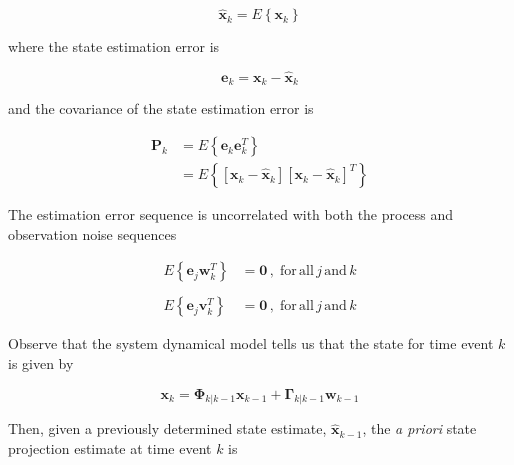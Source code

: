 \begin{equation}
    \hat{\mathbf{x}}_k = E \left\{ \mathbf{x}_k \right\}
    \label{eq:state-estimate}
\end{equation}

where the state estimation error is

\begin{equation*}
    \mathbf{e}_k = \mathbf{x}_{k} - \hat{\mathbf{x}}_k
\end{equation*}

and the covariance of the state estimation error is

\begin{equation}
    \begin{aligned}
        \mathbf{P}_k &= E \left\{ \mathbf{e}_k \mathbf{e}_k^T \right\} \\
        &= E \left\{ \left[ \mathbf{x}_{k} - \hat{\mathbf{x}}_k \right] \left[ \mathbf{x}_{k} - \hat{\mathbf{x}}_k \right]^T \right\}
    \end{aligned}
    \label{eq:state-estimate-error-covariance}
\end{equation}

The estimation error sequence is uncorrelated with both the process and observation noise sequences

\begin{equation*}
    \begin{aligned}
        E \left\{ \mathbf{e}_j \mathbf{w}_k^T \right\} &= \mathbf{0} \, , \phantom{.} \mathrm{for} \, \mathrm{all} \, j \, \mathrm{and} \, k \\
        \phantom{.} \\
        E \left\{ \mathbf{e}_j \mathbf{v}_k^T \right\} &= \mathbf{0} \, , \phantom{.} \mathrm{for} \, \mathrm{all} \, j \, \mathrm{and} \, k
    \end{aligned}
\end{equation*}

Observe that the system dynamical model tells us that the state for time event $k$ is given by

\begin{equation*}
    \mathbf{x}_{k} = \mathbf{\Phi}_{k|k-1} \mathbf{x}_{k-1} + \mathbf{\Gamma}_{k|k-1} \mathbf{w}_{k-1}
\end{equation*}

Then, given a previously determined state estimate, $\hat{\mathbf{x}}_{k-1}$, the
\textit{a priori} state projection estimate at time event $k$ is


